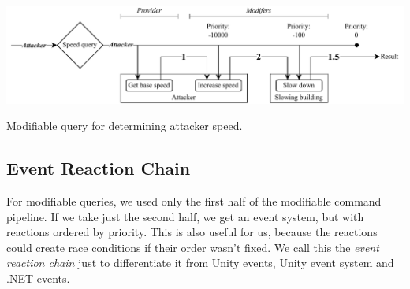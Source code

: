 \begin{center}
    \captionsetup{type=figure}
    \includegraphics[width=\textwidth]{img/modifiable query.pdf}
    \caption{Modifiable query for determining attacker speed.}
    \label{fig:modifiable-query}
\end{center}

\subsection{Event Reaction Chain}

For modifiable queries, we used only the first half of the modifiable command pipeline.
If we take just the second half, we get an event system, but with reactions ordered by priority.
This is also useful for us, because the reactions could create race conditions if their order wasn't fixed.
We call this the \emph{event reaction chain} just to differentiate it from Unity events, Unity event system and .NET events.